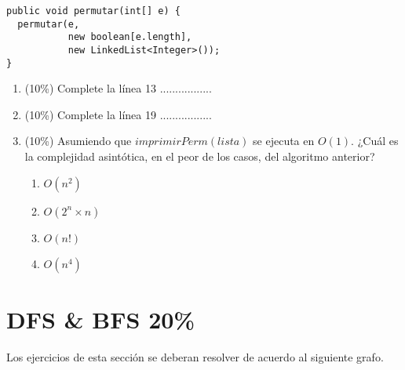 \documentclass[10 pt]{article}
\begin{document}
\begin{multicols}{2}
\begin{lstlisting}
public void permutar(int[] e) {
  permutar(e, 
           new boolean[e.length], 
           new LinkedList<Integer>());	
}
\end{lstlisting}
\begin{enumerate}[label=(\alph*)]
\item (10\%) Complete la línea 13 .................
\item (10\%) Complete la línea 19 .................
\item (10\%) Asumiendo que $imprimirPerm(lista)$ se ejecuta en $O(1)$. ¿Cuál es la complejidad asintótica, en el peor de  los casos, del algoritmo anterior?
\begin{enumerate}[label=(\roman*)]
\item $O(n^2)$
\item $O(2^n \times n)$
\item $O(n!)$
\item $O(n^4)$
\end{enumerate}
\end{enumerate}
\section{DFS \& BFS 20\%}
Los ejercicios de esta sección se deberan resolver de acuerdo al siguiente grafo.
\\


\end{multicols}
\end{document}
